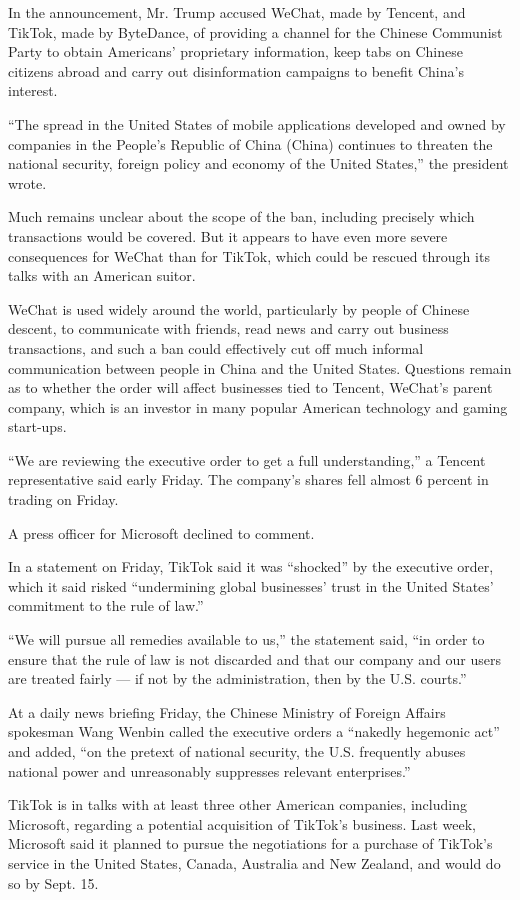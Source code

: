 In the announcement, Mr. Trump accused WeChat, made by Tencent, and
TikTok, made by ByteDance, of providing a channel for the Chinese
Communist Party to obtain Americans' proprietary information, keep tabs
on Chinese citizens abroad and carry out disinformation campaigns to
benefit China's interest.

``The spread in the United States of mobile applications developed and
owned by companies in the People's Republic of China (China) continues
to threaten the national security, foreign policy and economy of the
United States,'' the president wrote.

Much remains unclear about the scope of the ban, including precisely
which transactions would be covered. But it appears to have even more
severe consequences for WeChat than for TikTok, which could be rescued
through its talks with an American suitor.

WeChat is used widely around the world, particularly by people of
Chinese descent, to communicate with friends, read news and carry out
business transactions, and such a ban could effectively cut off much
informal communication between people in China and the United States.
Questions remain as to whether the order will affect businesses tied to
Tencent, WeChat's parent company, which is an investor in many popular
American technology and gaming start-ups.

``We are reviewing the executive order to get a full understanding,'' a
Tencent representative said early Friday. The company's shares fell
almost 6 percent in trading on Friday.

A press officer for Microsoft declined to comment.

In a statement on Friday, TikTok said it was ``shocked'' by the
executive order, which it said risked ``undermining global businesses'
trust in the United States' commitment to the rule of law.''

``We will pursue all remedies available to us,'' the statement said,
``in order to ensure that the rule of law is not discarded and that our
company and our users are treated fairly --- if not by the
administration, then by the U.S. courts.''

At a daily news briefing Friday, the Chinese Ministry of Foreign Affairs
spokesman Wang Wenbin called the executive orders a ``nakedly hegemonic
act'' and added, ``on the pretext of national security, the U.S.
frequently abuses national power and unreasonably suppresses relevant
enterprises.''

TikTok is in talks with at least three other American companies,
including Microsoft, regarding a potential acquisition of TikTok's
business. Last week, Microsoft said it planned to pursue the
negotiations for a purchase of TikTok's service in the United States,
Canada, Australia and New Zealand, and would do so by Sept. 15.

